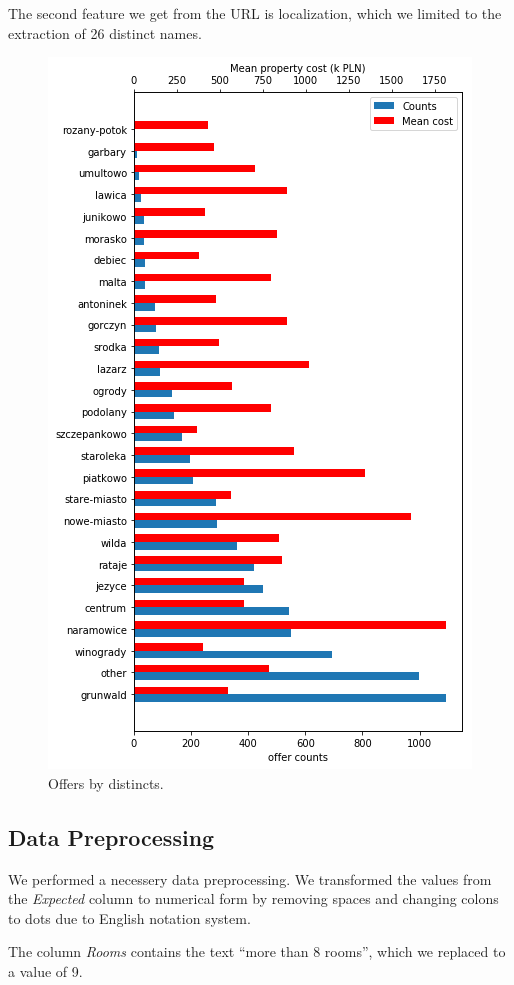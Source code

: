 \documentclass[11pt,a4paper]{article}
\begin{document}
The second feature we get from the URL is localization, which we limited to the extraction of 26 distinct names.
\begin{figure}[htpb]
  \centering
  \includegraphics[width=0.8\linewidth]{./plots/distincts.png}
  \caption{Offers by distincts.}\label{fig:dist}
\end{figure}
\subsection{Data Preprocessing}%
\label{sub:preprocessing}
We performed a necessery data preprocessing. We transformed the values from the \emph{Expected} column to numerical form by removing spaces and changing colons to dots due to English notation system.

The column \emph{Rooms} contains the text ``more than 8 rooms'', which we replaced to a value of 9.
\end{document}
